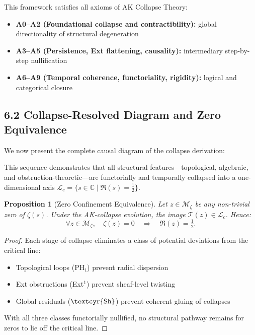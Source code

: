 \documentclass[11pt]{article}
\newtheorem{proposition}[theorem]{Proposition}
\newcommand{\Sha}{\text{\textcyr{Sh}}}
\begin{document}
This framework satisfies all axioms of AK Collapse Theory:

\begin{itemize}
    \item \textbf{A0–A2 (Foundational collapse and contractibility):} global directionality of structural degeneration
    \item \textbf{A3–A5 (Persistence, Ext flattening, causality):} intermediary step-by-step nullification
    \item \textbf{A6–A9 (Temporal coherence, functoriality, rigidity):} logical and categorical closure
\end{itemize}

\subsection{6.2 Collapse-Resolved Diagram and Zero Equivalence}

We now present the complete causal diagram of the collapse derivation:

\begin{center}
\end{center}


This sequence demonstrates that all structural features—topological, algebraic, and obstruction-theoretic—are functorially and temporally collapsed  
into a one-dimensional axis $\mathcal{L}_c = \{ s \in \mathbb{C} \mid \Re(s) = \tfrac{1}{2} \}$.

\begin{proposition}[Zero Confinement Equivalence]
Let $z \in \mathcal{M}_\zeta$ be any non-trivial zero of $\zeta(s)$.  
Under the AK-collapse evolution, the image $\mathcal{T}(z) \in \mathcal{L}_c$.  
Hence:
\[
\forall z \in \mathcal{M}_\zeta, \quad \zeta(z) = 0 \quad \Rightarrow \quad \Re(z) = \tfrac{1}{2}.
\]
\end{proposition}

\begin{proof}
Each stage of collapse eliminates a class of potential deviations from the critical line:
\begin{itemize}
    \item Topological loops (PH₁) prevent radial dispersion
    \item Ext obstructions (Ext$^1$) prevent sheaf-level twisting
    \item Global residuals ($\Sha$) prevent coherent gluing of collapses
\end{itemize}
With all three classes functorially nullified, no structural pathway remains for zeros to lie off the critical line.
\end{proof}
\end{document}
